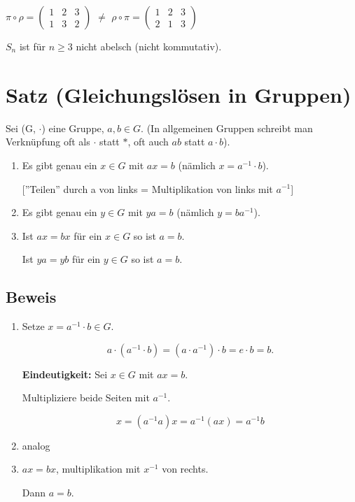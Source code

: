 \documentclass[a4paper, openany]{book}
\begin{document}
  $\pi \circ \rho = \begin{pmatrix}1 & 2 & 3 \\ 1 & 3 & 2 \end{pmatrix}$ $\neq$ $\rho \circ \pi = \begin{pmatrix}1 & 2 & 3 \\ 2 & 1 & 3 \end{pmatrix}$

  $S_n$ ist für $n \ge 3$ nicht abelsch (nicht kommutativ).

  \section{Satz (Gleichungslösen in Gruppen)}

  Sei (G, $\cdot$) eine Gruppe, $a,b \in G$. (In allgemeinen Gruppen schreibt man Verknüpfung oft als $\cdot$ statt $\ast$, oft auch $ab$ statt $a \cdot b$).

  \begin{enumerate}[label=(\alph*)]
    \item Es gibt genau ein $x \in G$ mit $ax = b$ (nämlich $x = a^{-1} \cdot b$).

    [''Teilen'' durch a von links = Multiplikation von links mit $a^{-1}$]

    \item Es gibt genau ein $y \in G$ mit $ya = b$ (nämlich $y = ba^{-1}$).

    \item Ist $ax = bx$ für ein $x \in G$ so ist $a = b$.

    Ist $ya = yb$ für ein $y \in G$ so ist $a=b$.
  \end{enumerate}

  \subsection{Beweis}

  \begin{enumerate}[label=(\alph*)]
    \item Setze $x = a^{-1} \cdot b \in G$.

    \begin{equation}
      a \cdot (a^{-1} \cdot b) = (a \cdot a^{-1}) \cdot b = e \cdot b = b.
    \end{equation}

    \textbf{Eindeutigkeit:} Sei $x \in G$ mit $ax = b$.

    Multipliziere beide Seiten mit $a^{-1}$.

    \begin{equation}
      x = (a^{-1}a)x = a^{-1}(ax) = a^{-1}b
    \end{equation}

    \item analog

    \item $ax = bx$, multiplikation mit $x^{-1}$ von rechts.

    Dann $a=b$.
  \end{enumerate}
\end{document}
